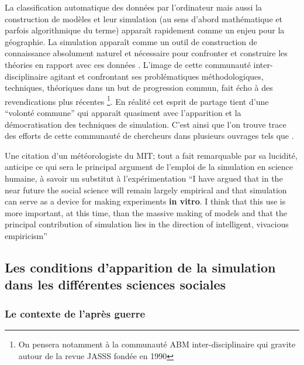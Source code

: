 La classification automatique des données par l'ordinateur mais aussi la construction de modèles et leur simulation (au sens d'abord mathématique et parfois algorithmique du terme) apparaît rapidement comme un enjeu pour la géographie. La simulation apparaît comme un outil de construction de connaissance absolument naturel et nécessaire pour confronter et construire les théories en rapport avec ces données \autocite{Kao1963, Hagerstrand1967b}. L'image de cette communauté inter-disciplinaire agitant et confrontant ses problématiques méthodologiques, techniques, théoriques dans un but de progression commun, fait écho à des revendications plus récentes \footnote{On pensera notamment à la communauté ABM inter-disciplinaire qui gravite autour de la revue JASSS fondée en  1990}. En réalité cet esprit de partage tient d'une \enquote{volonté commune} qui apparaît quasiment avec l'apparition et la démocratisation des techniques de simulation. C'est ainsi que l'on trouve trace des efforts de cette communauté de chercheurs dans plusieurs ouvrages tels que \autocite{Beshers1965,Naylor1966,Dutton1971,Guetzkow1962,Guetzkow1972}.

Une citation d'un météorologiste du MIT; tout a fait remarquable par sa lucidité, anticipe ce qui sera le principal argument de l'emploi de la simulation en science humaine, à savoir un substitut à l'expérimentation \foreignquote{english}{I have argued that in the near future the social science will remain largely empirical and that simulation can serve as a device for making experiments \textbf{in vitro}. I think that this use is more important, at this time, than the massive making of models and that the principal contribution of simulation lies in the direction of intelligent, vivacious empiricism} \autocite{Fleisher1965}


\subsection{Les conditions d'apparition de la simulation dans les différentes sciences sociales }
\label{sec:apparition_simu_science_sociales}

\subsubsection{Le contexte de l'après guerre}
\label{ssec:contexte_apres_guerre}

